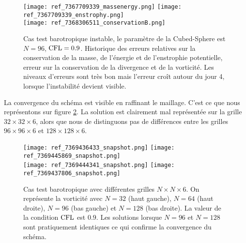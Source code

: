 \begin{figure}[htbp]
\begin{center}
\texttt{[image: ref\_7367709339\_massenergy.png]}
\texttt{[image: ref\_7367709339\_enstrophy.png]}\\
\texttt{[image: ref\_7368306511\_conservationB.png]}
\end{center}
\caption{Cas test barotropique instable, le paramètre de la Cubed-Sphere est $N=96$, $\text{CFL}=0.9$. Historique des erreurs relatives sur la conservation de la masse, de l'énergie et de l'enstrophie potentielle, erreur sur la conservation de la divergence et de la vorticité. Les niveaux d'erreurs sont très bon mais l'erreur croît autour du jour 4, lorsque l'instabilité devient visible.}
\label{fig: galewsky conservation}
\end{figure}

La convergence du schéma est visible en raffinant le maillage. C'est ce que nous représentons sur figure \ref{fig: galewsky convergence}. La solution est clairement mal représentée sur la grille $32 \times 32 \times 6$, alors que nous de distinguons pas de différences entre les grilles $96 \times 96\times 6$ et $128 \times 128\times 6$.

\begin{figure}[htbp]
\begin{center}
\texttt{[image: ref\_7369436433\_snapshot.png]}
\texttt{[image: ref\_7369445869\_snapshot.png]}\\
\texttt{[image: ref\_7369444341\_snapshot.png]}
\texttt{[image: ref\_7369437806\_snapshot.png]}
\end{center}
\caption{Cas test barotropique avec différentes grilles $N \times N \times 6$. On représente la vorticité avec $N=32$ (haut gauche), $N=64$ (haut droite), $N=96$ (bas gauche) et $N=128$ (bas droite). La valeur de la condition $\text{CFL}$ est $0.9$. Les solutions lorsque $N=96$ et $N=128$ sont pratiquement identiques ce qui confirme la convergence du schéma.}
\label{fig: galewsky convergence}
\end{figure}



























